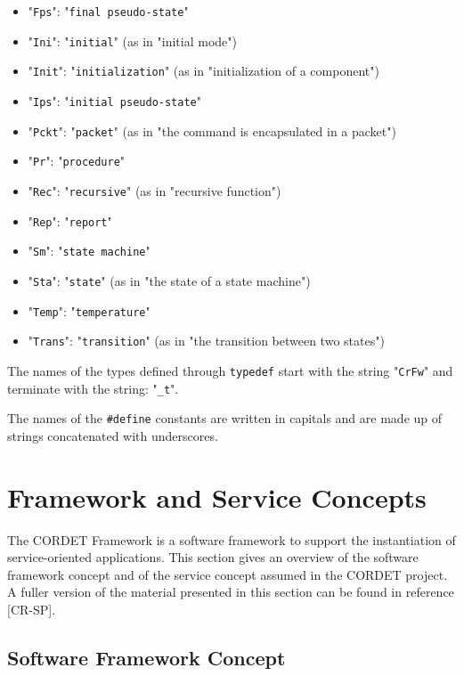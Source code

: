\documentclass{pnp_article}
\begin{document}
\begin{itemize}
\item "\texttt{Fps}": "\texttt{final pseudo-state}"
\item "\texttt{Ini}": "\texttt{initial}" (as in "initial mode")
\item "\texttt{Init}": "\texttt{initialization}" (as in "initialization of a component")
\item "\texttt{Ips}": "\texttt{initial pseudo-state}"
\item "\texttt{Pckt}": "\texttt{packet}" (as in "the command is encapsulated in a packet")
\item "\texttt{Pr}": "\texttt{procedure}"
\item "\texttt{Rec}": "\texttt{recursive}" (as in "recursive function")
\item "\texttt{Rep}": "\texttt{report}"
\item "\texttt{Sm}": "\texttt{state machine}"
\item "\texttt{Sta}": "\texttt{state}" (as in "the state of a state machine")
\item "\texttt{Temp}": "\texttt{temperature}"
\item "\texttt{Trans}": "\texttt{transition}" (as in "the transition between two states")
\end{itemize}

The names of the types defined through \texttt{typedef} start with the string "\texttt{CrFw}" and 
terminate with the string: "\texttt{\_t}".

The names of the \texttt{\#define} constants are written in capitals and are made 
up of strings concatenated with underscores.

\section{Framework and Service Concepts}
The CORDET Framework is a software framework to support the instantiation of service-oriented applications. 
This section gives an overview of the software framework concept and of the service concept assumed in the CORDET project.
A fuller version of the material presented in this section can be found in reference [CR-SP].

\subsection{Software Framework Concept}\label{sec:SwFwConcept} 

\end{document}
